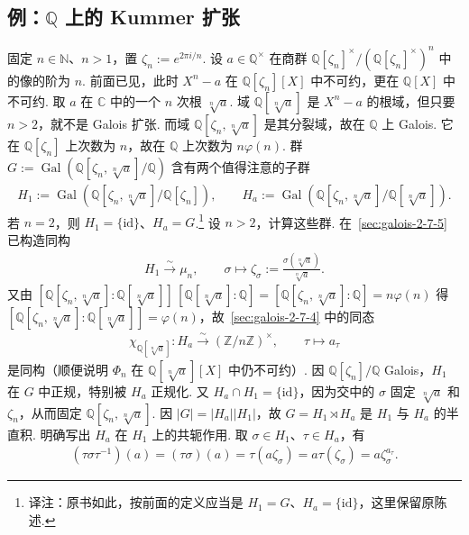 \subsection{例：$\mathbb Q$ 上的 Kummer 扩张}\label{sec:galois-2-7-8}
固定 $n\in\mathbb N$、$n>1$，置 $\zeta_n:=e^{2\pi i/n}$. 设 $a\in\mathbb Q^\times$ 在商群 $\mathbb Q[\zeta_n]^\times/(\mathbb Q[\zeta_n]^\times)^n$ 中的像的阶为 $n$. 前面已见，此时 $X^n-a$ 在 $\mathbb Q[\zeta_n][X]$ 中不可约，更在 $\mathbb Q[X]$ 中不可约. 取 $a$ 在 $\mathbb C$ 中的一个 $n$ 次根 $\sqrt[n]a$. 域 $\mathbb Q[\sqrt[n]a]$ 是 $X^n-a$ 的根域，但只要 $n>2$，就不是 Galois 扩张. 而域 $\mathbb Q[\zeta_n,\sqrt[n]a]$ 是其分裂域，故在 $\mathbb Q$ 上 Galois. 它在 $\mathbb Q[\zeta_n]$ 上次数为 $n$，故在 $\mathbb Q$ 上次数为 $n\varphi(n)$. 群 $G:=\operatorname{Gal}(\mathbb Q[\zeta_n,\sqrt[n]a]/\mathbb Q)$ 含有两个值得注意的子群
\begin{align*}
H_1:=\operatorname{Gal}(\mathbb Q[\zeta_n,\sqrt[n]a]/\mathbb Q[\zeta_n]),\qquad H_a:=\operatorname{Gal}(\mathbb Q[\zeta_n,\sqrt[n]a]/\mathbb Q[\sqrt[n]a]).
\end{align*}
若 $n=2$，则 $H_1=\{\mathrm{id}\}$、$H_a=G$.\footnote{译注：原书如此，按前面的定义应当是 $H_1=G$、$H_a=\{\mathrm{id}\}$，这里保留原陈述.} 设 $n>2$，计算这些群. 在~\ref{sec:galois-2-7-5} 已构造同构
\begin{align*}H_1\xrightarrow{\sim}\mu_n,\qquad\sigma\mapsto\zeta_\sigma:=\frac{\sigma(\sqrt[n]a)}{\sqrt[n]a}.\end{align*}
又由 $[\mathbb Q[\zeta_n,\sqrt[n]a]:\mathbb Q[\sqrt[n]a]]\,[\mathbb Q[\sqrt[n]a]:\mathbb Q]=[\mathbb Q[\zeta_n,\sqrt[n]a]:\mathbb Q]=n\varphi(n)$ 得 $[\mathbb Q[\zeta_n,\sqrt[n]a]:\mathbb Q[\sqrt[n]a]]=\varphi(n)$，故~\ref{sec:galois-2-7-4} 中的同态
\begin{align*}\chi_{\mathbb Q[\sqrt[n]a]}:H_a\xrightarrow{\sim}(\mathbb Z/n\mathbb Z)^\times,\qquad\tau\mapsto a_\tau\end{align*}
是同构（顺便说明 $\Phi_n$ 在 $\mathbb Q[\sqrt[n]a][X]$ 中仍不可约）. 因 $\mathbb Q[\zeta_n]/\mathbb Q$ Galois，$H_1$ 在 $G$ 中正规，特别被 $H_a$ 正规化. 又 $H_a\cap H_1=\{\mathrm{id}\}$，因为交中的 $\sigma$ 固定 $\sqrt[n]a$ 和 $\zeta_n$，从而固定 $\mathbb Q[\zeta_n,\sqrt[n]a]$. 因 $|G|=|H_a||H_1|$，故 $G=H_1\rtimes H_a$ 是 $H_1$ 与 $H_a$ 的半直积. 明确写出 $H_a$ 在 $H_1$ 上的共轭作用. 取 $\sigma\in H_1$、$\tau\in H_a$，有
\begin{align*}(\tau\sigma\tau^{-1})(a)=(\tau\sigma)(a)=\tau(a\zeta_\sigma)=a\tau(\zeta_\sigma)=a\zeta_\sigma^{a_\tau}.\end{align*}
